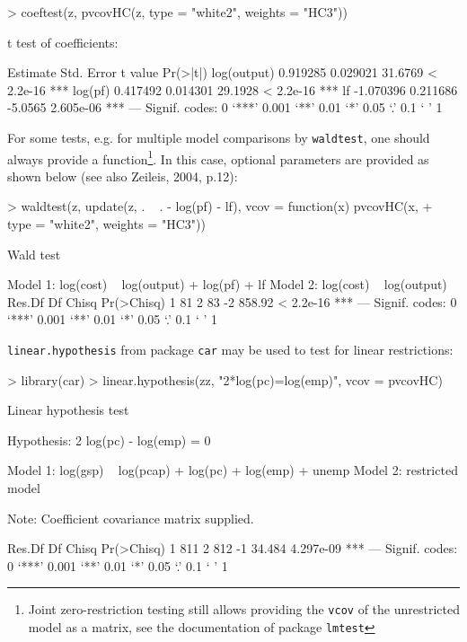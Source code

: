 \documentclass[a4paper]{article}
\begin{document}
\begin{Schunk}
\begin{Sinput}
> coeftest(z, pvcovHC(z, type = "white2", weights = "HC3"))
\end{Sinput}
\begin{Soutput}
t test of coefficients:

             Estimate Std. Error t value  Pr(>|t|)    
log(output)  0.919285   0.029021 31.6769 < 2.2e-16 ***
log(pf)      0.417492   0.014301 29.1928 < 2.2e-16 ***
lf          -1.070396   0.211686 -5.0565 2.605e-06 ***
---
Signif. codes:  0 ‘***’ 0.001 ‘**’ 0.01 ‘*’ 0.05 ‘.’ 0.1 ‘ ’ 1 
\end{Soutput}
\end{Schunk}

For some tests, e.g. for multiple model comparisons by \texttt{waldtest}, one should always provide a function\footnote{Joint zero-restriction testing still allows providing the \texttt{vcov} of the unrestricted model as a matrix, see the documentation of package \texttt{lmtest}}. In this case, optional parameters are provided as shown below (see also Zeileis, 2004, p.12):

\begin{Schunk}
\begin{Sinput}
> waldtest(z, update(z, . ~ . - log(pf) - lf), vcov = function(x) pvcovHC(x, 
+     type = "white2", weights = "HC3"))
\end{Sinput}
\begin{Soutput}
Wald test

Model 1: log(cost) ~ log(output) + log(pf) + lf
Model 2: log(cost) ~ log(output)
  Res.Df Df  Chisq Pr(>Chisq)    
1     81                         
2     83 -2 858.92  < 2.2e-16 ***
---
Signif. codes:  0 ‘***’ 0.001 ‘**’ 0.01 ‘*’ 0.05 ‘.’ 0.1 ‘ ’ 1 
\end{Soutput}
\end{Schunk}

\texttt{linear.hypothesis} from package \texttt{car} may be used to test for linear restrictions:

\begin{Schunk}
\begin{Sinput}
> library(car)
> linear.hypothesis(zz, "2*log(pc)=log(emp)", vcov = pvcovHC)
\end{Sinput}
\begin{Soutput}
Linear hypothesis test

Hypothesis:
2 log(pc) - log(emp) = 0

Model 1: log(gsp) ~ log(pcap) + log(pc) + log(emp) + unemp
Model 2: restricted model

Note: Coefficient covariance matrix supplied.

  Res.Df  Df  Chisq Pr(>Chisq)    
1    811                          
2    812  -1 34.484  4.297e-09 ***
---
Signif. codes:  0 ‘***’ 0.001 ‘**’ 0.01 ‘*’ 0.05 ‘.’ 0.1 ‘ ’ 1 
\end{Soutput}
\end{Schunk}
\end{document}
